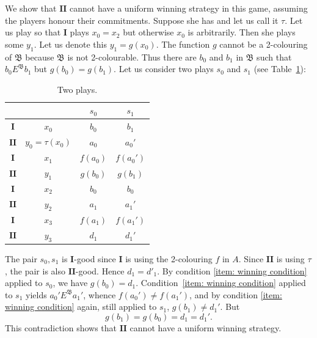 \documentclass[12pt]{article}
\theoremstyle{definition}
\newcommand{\playerone}{\mathrm{\mathbf{I}}}
\newcommand{\playertwo}{\mathrm{\mathbf{II}}}
\newcommand{\B}{\mathfrak{B}}
\def\mb{\B}
\begin{document}
We show that $\playertwo$ cannot have a uniform winning strategy in this game, assuming the players honour their commitments. Suppose she has and let us call it $\tau$. Let us  play so that $\playerone$ plays $x_0=x_2$ but otherwise $x_0$ is arbitrarily. Then she  plays some $y_1$. Let us denote this $y_1=g(x_0)$. The function $g$ cannot be a 2-colouring of $\mb$ because $\mb$ is not 2-colourable. Thus there are $b_0$ and $b_1$ in $\mb$ such that $b_0E^\mb b_1$ but $g(b_0)=g(b_1)$. Let us consider two plays $s_0$ and $s_1$ (see Table~\ref{tab:placeholder}):

\begin{table}[h]
\begin{center}
    \begin{tabular}{|c|c|cc|}
     \hline
        \multicolumn{2}{|c}{} & $s_0$ & $s_1$ \\
        \hline
        $\playerone$&$ x_0$  & $b_0$ & $b_1$ \\
        $\playertwo$&$y_0=\tau(x_0)$ &  $a_0$ & $a_0'$ \\
        $\playerone$&$x_1$ &  $f(a_0)$ & $f(a_0')$ \\
        $\playertwo$&$y_1$  & $g(b_0)$ &$g(b_1)$\\
        $\playerone$&$x_2$ & $b_0$& $b_0$ \\
        $\playertwo$&$y_2$ & $a_1$  & $a_1'$ \\
        $\playerone$&$x_3$ & $f(a_1)$  & $f(a_1')$ \\
        $\playertwo$&$y_3$ &   $d_1$& $d_1'$\\
         \hline
    \end{tabular}
\end{center} \caption{Two plays.}
    \label{tab:placeholder}\end{table}

The pair $s_0,s_1$ is $\playerone$-good since $\playerone$ is using the 2-colouring $f$ in $A$. Since $\playertwo$ is using  $\tau$, the pair is also $\playertwo$-good. Hence $d_1=d'_1$. By condition \ref{item: winning condition} applied to $s_0$, we have $g(b_0)=d_1$. Condition~\ref{item: winning condition} applied to $s_1$ yields $a_0'E^\mb a_1'$, whence $f(a_0')\ne f(a_1')$, and by condition \ref{item: winning condition} again, still applied to $s_1$, $g(b_1)\ne d_1'$. But
\[
    g(b_1)=g(b_0)=d_1=d_1'.
\]
This contradiction shows that $\playertwo$ cannot have a uniform winning strategy.
\end{document}
